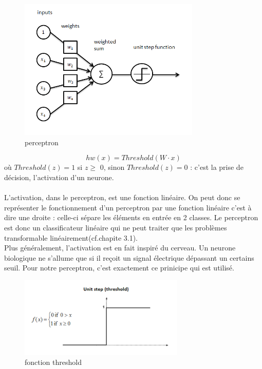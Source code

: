 \documentclass[openany,14pt,fleqn]{book} %
\begin{document}
\begin{figure}[h]
    \centering
    \includegraphics[width=0.77\textwidth]{Pictures/perceptron.png}
    \caption{perceptron }
    \label{fig:awesome_image}
\end{figure}
\begin{equation}                                                                                                hw(x) = Threshold(W\cdot x)\end{equation}
où $Threshold(z) = 1$  si $z \geq$ 0, 
sinon $Threshold(z) = 0$ : c'est la prise de décision, l'activation d'un neurone.\\\\ L'activation, dans le perceptron, est une fonction linéaire. On peut donc se représenter le fonctionnement d'un perceptron par une fonction linéaire c'est à dire une droite : celle-ci sépare les éléments en entrée en 2 classes. \newline Le perceptron est donc un classificateur linéaire qui ne peut traiter que les problèmes transformable linéairement(cf.chapite 3.1).\\ Plus généralement, l'activation est en fait inspiré du cerveau. Un neurone biologique ne s'allume que si il reçoit un signal électrique dépassant un certains seuil. Pour notre perceptron, c'est exactement ce prinicipe qui est utilisé.
\begin{figure}[h]
\centering
\includegraphics[width=0.7\textwidth]{Pictures/t_l_chargement.png}
\caption{fonction threshold}
\end{figure}
\end{document}
